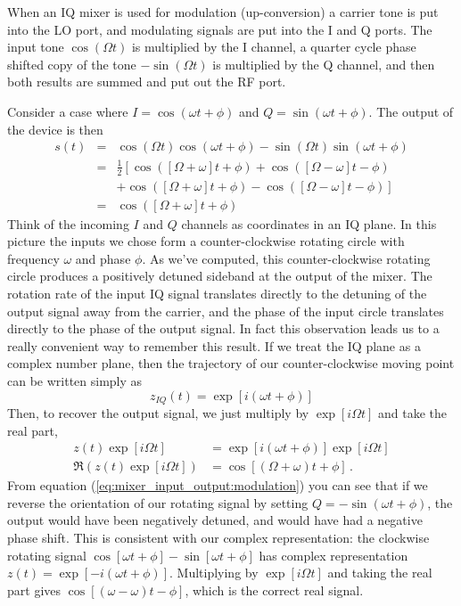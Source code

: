 
When an IQ mixer is used for modulation (up-conversion) a carrier tone is put into the LO port, and modulating signals are put into the I and Q ports. The input tone $\cos ( \Omega t)$ is multiplied by the I channel, a quarter cycle phase shifted copy of the tone $-\sin ( \Omega t)$ is multiplied by the Q channel, and then both results are summed and put out the RF port.

Consider a case where $I=\cos(\omega t + \phi)$ and $Q=\sin(\omega t + \phi)$. The output of the device is then \begin{eqnarray}
s(t) &=& \cos(\Omega t)\cos(\omega t + \phi) - \sin(\Omega t)\sin(\omega t + \phi) \nonumber \\
&=& \frac{1}{2} \left[ \cos([\Omega + \omega]t + \phi) + \cos([\Omega-\omega]t - \phi) \right. \nonumber \\ 
& & \left. + \cos([\Omega+\omega]t + \phi) - \cos([\Omega-\omega]t-\phi) \right] \label{eq:mixer_input_output:modulation} \nonumber \\
&=& \cos([\Omega+\omega]t + \phi)
\end{eqnarray}
Think of the incoming $I$ and $Q$ channels as coordinates in an IQ plane. In this picture the inputs we chose form a counter-clockwise rotating circle with frequency $\omega$ and phase $\phi$. As we've computed, this counter-clockwise rotating circle produces a positively detuned sideband at the output of the mixer. The rotation rate of the input IQ signal translates directly to the detuning of the output signal away from the carrier, and the phase of the input circle translates directly to the phase of the output signal. In fact this observation leads us to a really convenient way to remember this result. If we treat the IQ plane as a complex number plane, then the trajectory of our counter-clockwise moving point can be written simply as \begin{equation}
z_{IQ}(t) = \exp[i(\omega t + \phi)] \label{eq:mixer_input_output:modulation_complex_rep} \end{equation}
Then, to recover the output signal, we just multiply by $\exp[i\Omega t]$ and take the real part,
\begin{align}
z(t)\exp[i\Omega t] &= \exp[i(\omega t + \phi)]\exp[i\Omega t] \nonumber \\
\Re \left( z(t)\exp[i\Omega t] \right ) &= \cos[(\Omega+\omega)t+\phi] \nonumber \, .
\end{align}
From equation (\ref{eq:mixer_input_output:modulation}) you can see that if we reverse the orientation of our rotating signal by setting $Q=-\sin(\omega t + \phi)$, the output would have been negatively detuned, and would have had a negative phase shift. This is consistent with our complex representation: the clockwise rotating signal $\cos[\omega t + \phi] - \sin[\omega t + \phi]$ has complex representation $z(t) = \exp[-i(\omega t + \phi)]$. Multiplying by $\exp[i\Omega t]$ and taking the real part gives $\cos[(\omega-\omega)t - \phi]$, which is the correct real signal.

